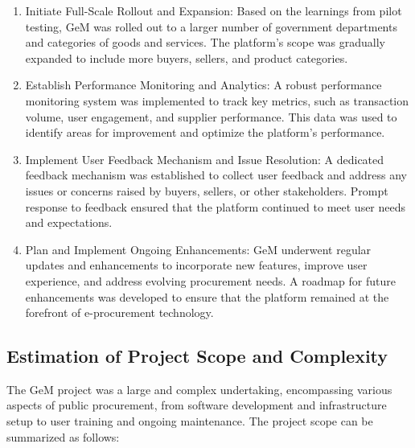 \begin{enumerate}
    \item Initiate Full-Scale Rollout and Expansion: Based on the learnings from pilot testing, GeM was rolled out to a larger number of government departments and categories of goods and services. The platform's scope was gradually expanded to include more buyers, sellers, and product categories.
    
    \item Establish Performance Monitoring and Analytics: A robust performance monitoring system was implemented to track key metrics, such as transaction volume, user engagement, and supplier performance. This data was used to identify areas for improvement and optimize the platform's performance.
    
    \item Implement User Feedback Mechanism and Issue Resolution: A dedicated feedback mechanism was established to collect user feedback and address any issues or concerns raised by buyers, sellers, or other stakeholders. Prompt response to feedback ensured that the platform continued to meet user needs and expectations.
    
    \item Plan and Implement Ongoing Enhancements: GeM underwent regular updates and enhancements to incorporate new features, improve user experience, and address evolving procurement needs. A roadmap for future enhancements was developed to ensure that the platform remained at the forefront of e-procurement technology.
\end{enumerate}

\subsection{Estimation of Project Scope and Complexity}

The GeM project was a large and complex undertaking, encompassing various aspects of public procurement, from software development and infrastructure setup to user training and ongoing maintenance. The project scope can be summarized as follows:

